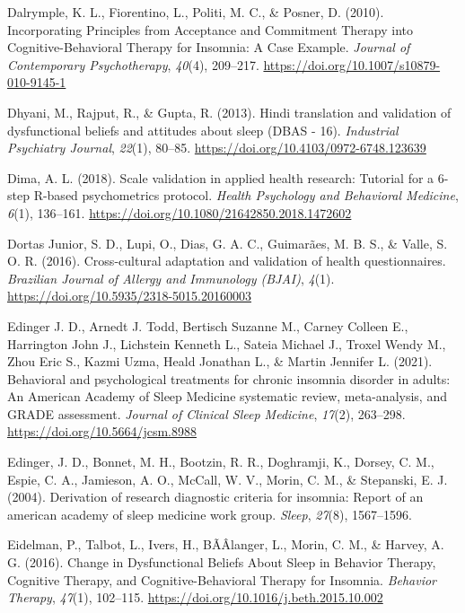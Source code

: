 \documentclass[
  ,doc,11pt, twoside,floatsintext]{apa6}
\newlength{\cslhangindent}
\newlength{\cslentryspacingunit} %
\newenvironment{CSLReferences}[2] %
 {%
  \setlength{\parindent}{0pt}
  \ifodd #1
  \let\oldpar\par
  \def\par{\hangindent=\cslhangindent\oldpar}
  \fi
  \setlength{\parskip}{#2\cslentryspacingunit}
 }%
 {}
\begin{document}
\begin{CSLReferences}{1}{0}
\leavevmode{}%
Dalrymple, K. L., Fiorentino, L., Politi, M. C., \& Posner, D. (2010). Incorporating {Principles} from {Acceptance} and {Commitment Therapy} into {Cognitive-Behavioral Therapy} for {Insomnia}: {A Case Example}. \emph{Journal of Contemporary Psychotherapy}, \emph{40}(4), 209--217. \url{https://doi.org/10.1007/s10879-010-9145-1}

\leavevmode{}%
Dhyani, M., Rajput, R., \& Gupta, R. (2013). Hindi translation and validation of dysfunctional beliefs and attitudes about sleep ({DBAS} - 16). \emph{Industrial Psychiatry Journal}, \emph{22}(1), 80--85. \url{https://doi.org/10.4103/0972-6748.123639}

\leavevmode{}%
Dima, A. L. (2018). Scale validation in applied health research: Tutorial for a 6-step {R-based} psychometrics protocol. \emph{Health Psychology and Behavioral Medicine}, \emph{6}(1), 136--161. \url{https://doi.org/10.1080/21642850.2018.1472602}

\leavevmode{}%
Dortas Junior, S. D., Lupi, O., Dias, G. A. C., Guimarães, M. B. S., \& Valle, S. O. R. (2016). {Cross-cultural adaptation and validation of health questionnaires}. \emph{Brazilian Journal of Allergy and Immunology (BJAI)}, \emph{4}(1). \url{https://doi.org/10.5935/2318-5015.20160003}

\leavevmode{}%
Edinger J. D., Arnedt J. Todd, Bertisch Suzanne M., Carney Colleen E., Harrington John J., Lichstein Kenneth L., Sateia Michael J., Troxel Wendy M., Zhou Eric S., Kazmi Uzma, Heald Jonathan L., \& Martin Jennifer L. (2021). Behavioral and psychological treatments for chronic insomnia disorder in adults: An {American Academy} of {Sleep Medicine} systematic review, meta-analysis, and {GRADE} assessment. \emph{Journal of Clinical Sleep Medicine}, \emph{17}(2), 263--298. \url{https://doi.org/10.5664/jcsm.8988}

\leavevmode{}%
Edinger, J. D., Bonnet, M. H., Bootzin, R. R., Doghramji, K., Dorsey, C. M., Espie, C. A., Jamieson, A. O., McCall, W. V., Morin, C. M., \& Stepanski, E. J. (2004). Derivation of research diagnostic criteria for insomnia: Report of an american academy of sleep medicine work group. \emph{Sleep}, \emph{27}(8), 1567--1596.

\leavevmode{}%
Eidelman, P., Talbot, L., Ivers, H., BÃÂlanger, L., Morin, C. M., \& Harvey, A. G. (2016). Change in {Dysfunctional Beliefs About Sleep} in {Behavior Therapy}, {Cognitive Therapy}, and {Cognitive-Behavioral Therapy} for {Insomnia}. \emph{Behavior Therapy}, \emph{47}(1), 102--115. \url{https://doi.org/10.1016/j.beth.2015.10.002}


\end{CSLReferences}
\end{document}
